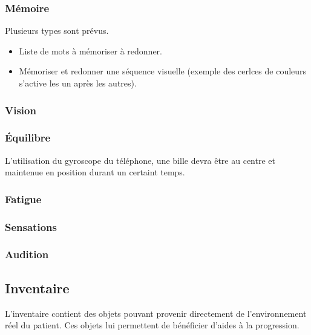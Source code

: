 \documentclass[a4paper,12pt,francais]{article}
\begin{document}
\subsubsection{Mémoire}
Plusieurs types sont prévus.
\begin{itemize}
    \item Liste de mots à mémoriser à redonner.
    \item Mémoriser et redonner une séquence visuelle (exemple des cerlces de couleurs s'active les un après les autres).
\end{itemize}
\subsubsection{Vision}
\subsubsection{Équilibre}
L'utilisation du gyroscope du téléphone, une bille devra être au centre et maintenue en position durant un certaint temps.
\subsubsection{Fatigue}
\subsubsection{Sensations}
\subsubsection{Audition}
\subsection{Inventaire}
L'inventaire contient des objets pouvant provenir directement de l'environnement réel du patient. Ces objets lui permettent de bénéficier d'aides à la progression.
\end{document}
